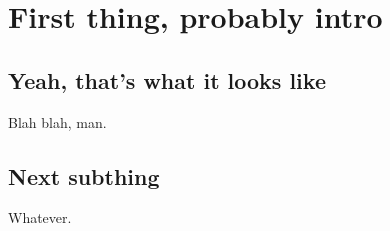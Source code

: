 \section{First thing, probably intro}
\subsection{Yeah, that's what it looks like}
Blah blah, man.
\subsection{Next subthing}
Whatever.
